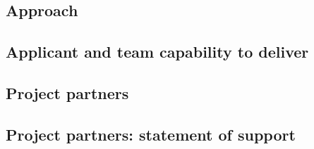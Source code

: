 \documentclass[12pt]{article}
\begin{document}
\begin{bibunit}

\putbib
\end{bibunit}

\pagebreak
\subsection{Approach}



\pagebreak
\subsection{Applicant and team capability to deliver}



\pagebreak
\subsection{Project partners}



\pagebreak
\subsection{Project partners: statement of support}


\end{document}
